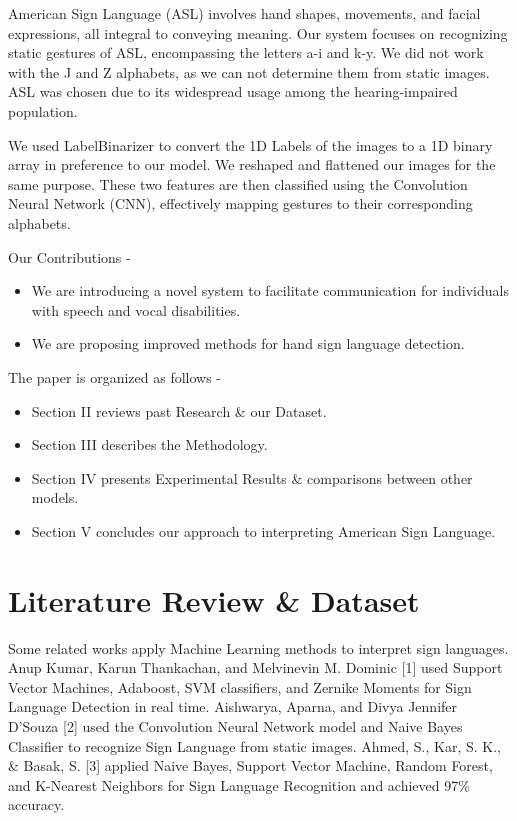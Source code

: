 \documentclass[conference]{IEEEtran}
\begin{document}
American Sign Language (ASL) involves hand shapes, movements, and facial expressions, all integral to conveying meaning. Our system focuses on recognizing static gestures of ASL, encompassing the letters a-i and k-y. We did not work with the J and Z alphabets, as we can not determine them from static images. ASL was chosen due to its widespread usage among the hearing-impaired population.
\vspace{\baselineskip}

We used LabelBinarizer to convert the 1D Labels of the images to a 1D binary array in preference to our model. We reshaped and flattened our images for the same purpose. These two features are then classified using the Convolution Neural Network (CNN), effectively mapping gestures to their corresponding alphabets.

\vspace{\baselineskip}
Our Contributions - 

\begin{itemize}
  \item We are introducing a novel system to facilitate communication for individuals with speech and vocal disabilities.
  \item We are proposing improved methods for hand sign language detection.
\end{itemize}

\vspace{\baselineskip}
\vspace{\baselineskip}
\vspace{\baselineskip}

The paper is organized as follows -

\begin{itemize}
  \item Section II reviews past Research \& our Dataset.
  \item Section III describes the Methodology.
  \item Section IV presents Experimental Results \& comparisons between other models.
  \item Section V concludes our approach to interpreting American Sign Language.
\end{itemize}

\vspace{\baselineskip}
\section{Literature Review \& Dataset}
\vspace{\baselineskip}
{\LARGE S}ome related works apply Machine Learning methods to interpret sign languages. Anup Kumar, Karun Thankachan, and Melvinevin M. Dominic [1] used Support Vector Machines, Adaboost, SVM classifiers, and Zernike Moments for Sign Language Detection in real time. Aishwarya, Aparna, and Divya Jennifer D’Souza [2] used the Convolution Neural Network model and Naive Bayes Classifier to recognize Sign Language from static images.  Ahmed, S., Kar, S. K., \& Basak, S. [3] applied Naive Bayes, Support Vector Machine, Random Forest, and K-Nearest Neighbors for Sign Language Recognition and achieved 97\% accuracy. 
\end{document}
